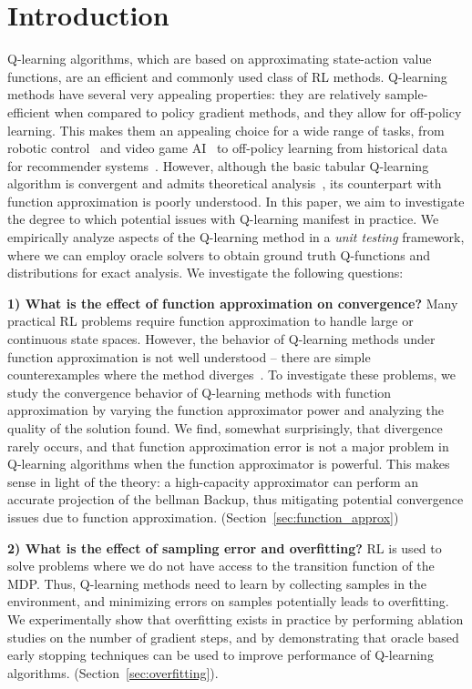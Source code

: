 \section{Introduction}
Q-learning algorithms, which are based on approximating state-action value functions, are an efficient and commonly used class of RL methods. Q-learning methods have several very appealing properties: they are relatively sample-efficient when compared to policy gradient methods, and they allow for off-policy learning. This makes them an appealing choice for a wide range of tasks, from robotic control~\citep{kalashnikov18} and video game AI~\citep{Mnih2015} to off-policy learning from historical data for recommender systems~\citep{shani2005recommender}. However, although the basic tabular Q-learning algorithm is convergent and admits theoretical analysis~\cite{suttonrlbook}, its counterpart with function approximation is poorly understood. 
In this paper, we aim to investigate the degree to which potential issues with Q-learning manifest in practice. 
We empirically analyze aspects of the Q-learning method in a \emph{unit testing} framework, where we can employ oracle solvers to obtain ground truth Q-functions and distributions for exact analysis. We investigate the following questions:

\textbf{1) What is the effect of function approximation on convergence?}
Many practical RL problems require function approximation to handle large or continuous state spaces. However, the behavior of Q-learning methods under function approximation is not well understood -- there are simple counterexamples where the method diverges~\citep{Baird1995}. 
To investigate these problems, we study the convergence behavior of Q-learning methods with function approximation by varying the function approximator power and analyzing the quality of the solution found. 
We find, somewhat surprisingly, that divergence rarely occurs, and that function approximation error is not a major problem in Q-learning algorithms when the function approximator is powerful. This makes sense in light of the theory: a high-capacity approximator can perform an accurate projection of the bellman Backup, thus mitigating potential convergence issues due to function approximation. (Section~\ref{sec:function_approx})

\textbf{2) What is the effect of sampling error and overfitting?}
RL is used to solve problems where we do not have access to the transition function of the MDP. Thus, Q-learning methods need to learn by collecting samples in the environment, and minimizing errors on samples potentially leads to overfitting. We experimentally show that overfitting exists in practice by performing ablation studies on the number of gradient steps, and by demonstrating that oracle based early stopping techniques can be used to improve performance of Q-learning algorithms. (Section~\ref{sec:overfitting}).

